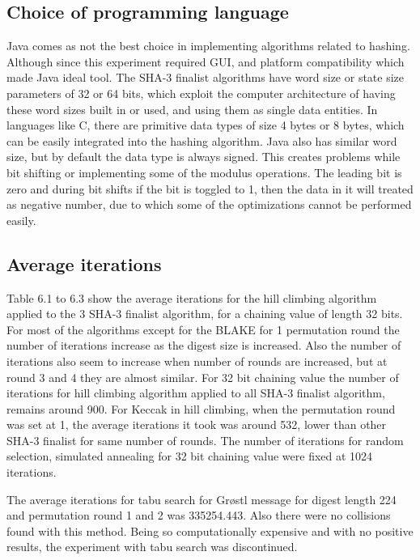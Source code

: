 \subsection{Choice of programming language}

Java comes as not the best choice in implementing algorithms related to hashing. Although since this experiment 
required GUI, and platform compatibility which made Java ideal tool. The SHA-3 finalist algorithms have word size
or state size parameters of 32 or 64 bits, which exploit the computer architecture of having these word sizes
built in or used, and using them as single data entities. In languages like C, there are primitive data types
of size 4 bytes or 8 bytes, which can be easily integrated into the hashing algorithm. Java also has similar
word size, but by default the data type is always signed. This creates problems while bit shifting or implementing
some of the modulus operations. The leading bit is zero and during bit shifts if the bit is toggled to 1, then 
the data in it will treated as negative number, due to which some of the optimizations cannot be performed easily.

\subsection{Average iterations}

Table 6.1 to 6.3 show the average iterations for the hill climbing algorithm applied to the 3 SHA-3 finalist algorithm,
for a chaining value of length 32 bits. For most of the algorithms except for the BLAKE for 1 permutation round
the number of iterations increase as the digest size is increased. Also the number of iterations also seem to
increase when number of rounds are increased, but at round 3 and 4 they are almost similar. For 32 bit chaining value
the number of iterations for hill climbing algorithm applied to all SHA-3 finalist algorithm, remains around 900.
For Keccak in hill climbing, when the permutation round was set at 1, the average iterations it took was around 532,
lower than other SHA-3 finalist for same number of rounds. The number of iterations for random selection, simulated
annealing for 32 bit chaining value were fixed at 1024 iterations.

The average iterations for tabu search for Gr{\o}stl message for digest length 224 and permutation round 1 and 2
was 335254.443. Also there were no collisions found with this method. Being so computationally expensive and with
no positive results, the experiment with tabu search was discontinued.

